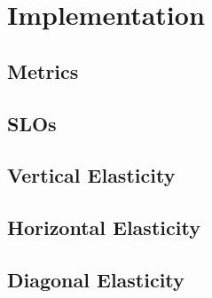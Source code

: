 \chapter{Implementation}
\label{ch:implementation}

\section{Metrics}
\label{sec:metrics}

\section{SLOs}
\label{sec:slos}

\section{Vertical Elasticity}
\label{sec:vertical-elasticity}

\section{Horizontal Elasticity}
\label{sec:horizontal-elasticity}

\section{Diagonal Elasticity}
\label{sec:diagonal-elasticity}
